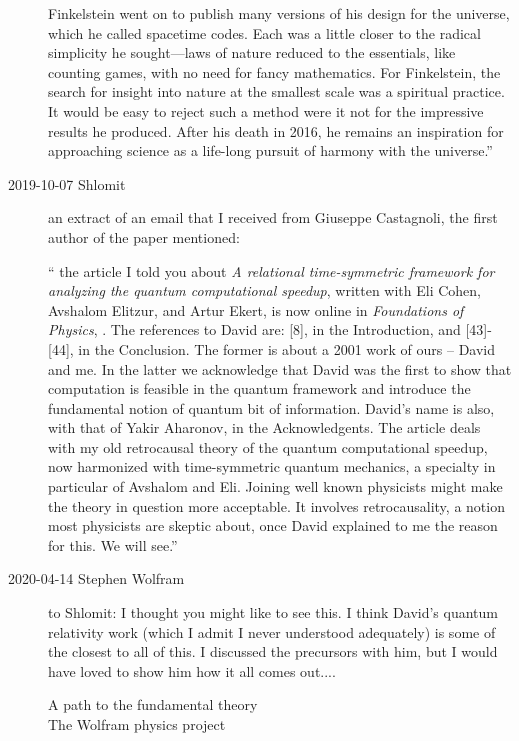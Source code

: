 \begin{description}
Finkelstein went on to publish many versions of his design for the
universe, which he called spacetime codes. Each was a little closer to
the radical simplicity he sought—laws of nature reduced to the
essentials, like counting games, with no need for fancy mathematics. For
Finkelstein, the search for insight into nature at the smallest scale was
a spiritual practice. It would be easy to reject such a method were it
not for the impressive results he produced. After his death in 2016, he
remains an inspiration for approaching science as a life-long pursuit of
harmony with the universe.''


\item[2019-10-07 Shlomit]
an extract of an email that I received from Giuseppe Castagnoli, the
first author of the paper mentioned:

``
the article I told you about {\em A relational time-symmetric
framework for analyzing the quantum computational speedup}, written with
Eli Cohen, Avshalom Elitzur, and Artur Ekert, is now online in
\emph{Foundations of Physics}, .
The references to David are: [8], in the Introduction, and [43]-[44], in
the Conclusion. The former is about a 2001 work of ours -- David and me.
In the latter we acknowledge that David was the first to show that
computation is feasible in the quantum framework and introduce the
fundamental notion of quantum bit of information. David's name is also,
with that of Yakir Aharonov, in the Acknowledgents. The article deals
with my old retrocausal theory of the quantum computational speedup, now
harmonized with time-symmetric quantum mechanics, a specialty in
particular of Avshalom and Eli. Joining well known physicists might make
the theory in question more acceptable. It involves retrocausality, a
notion most physicists are skeptic about, once David explained to me the
reason for this. We will see.''

\item[2020-04-14 Stephen Wolfram] to Shlomit:
    I thought you might like to see this.  I think David's quantum
    relativity work (which I admit I never understood adequately) is some
    of the closest to all of this.  I discussed the precursors with him,
    but I would have loved to show him how it all comes out....

\noindent
{}
{A path to the fundamental theory}
\\
{The Wolfram physics project}








\end{description}

\printbibliography[heading=subbibintoc,title={References}]
